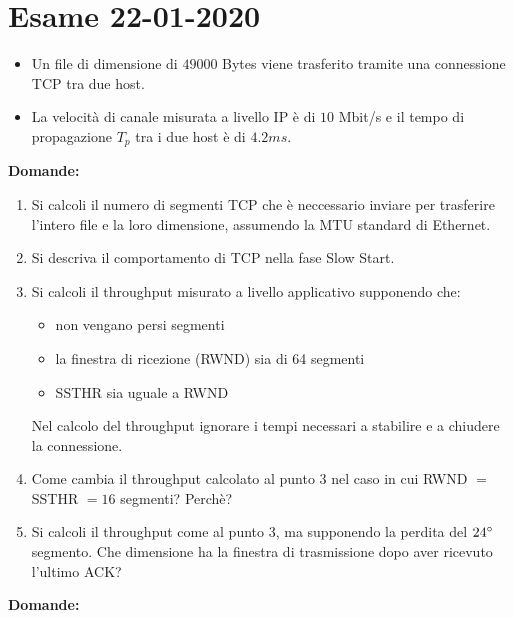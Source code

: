 \documentclass[10pt,a4paper]{article}
\begin{document}
	\section{Esame 22-01-2020}
	\begin{itemize}
		\item Un file di dimensione di $49000$ Bytes viene trasferito tramite una connessione TCP tra due host.
		\item La velocità di canale misurata a livello IP è di $10$ Mbit/s e il tempo di propagazione $T_p$ tra i due host è di $4.2ms$.
	\end{itemize}
	\textbf{Domande:}
	\begin{enumerate}
		\item Si calcoli il numero di segmenti TCP che è neccessario inviare per trasferire l'intero file e la loro dimensione, assumendo la MTU standard di Ethernet.
		\item Si descriva il comportamento di TCP nella fase Slow Start.
		\item Si calcoli il throughput misurato a livello applicativo supponendo che:
			\begin{itemize}
				\item non vengano persi segmenti
				\item la finestra di ricezione (RWND) sia di 64 segmenti
				\item SSTHR sia uguale a RWND
			\end{itemize}
			Nel calcolo del throughput ignorare i tempi necessari a stabilire e a chiudere la connessione.
		\item Come cambia il throughput calcolato al punto 3 nel caso in cui RWND $=$ SSTHR $= 16$ segmenti? Perchè?
		\item Si calcoli il throughput come al punto 3, ma supponendo la perdita del $24 \degree$ segmento. Che dimensione ha la finestra di trasmissione dopo aver ricevuto l'ultimo ACK? 
	\end{enumerate}
	\textbf{Domande:}
\end{document}
